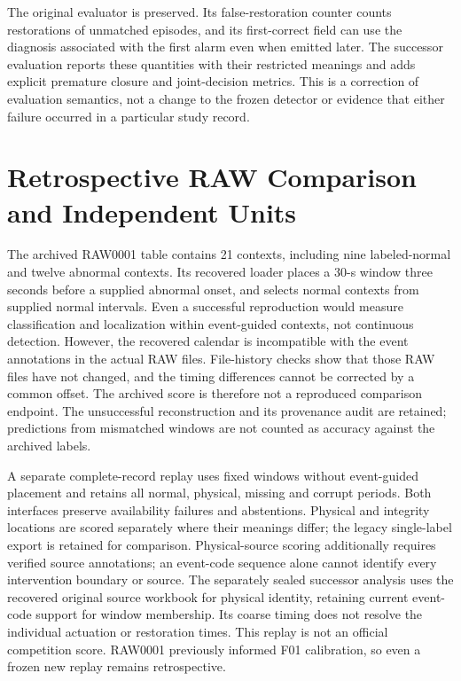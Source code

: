 The original evaluator is preserved. Its false-restoration
counter counts restorations of unmatched episodes, and its
first-correct field can use the diagnosis associated with the
first alarm even when emitted later. The successor evaluation reports these
quantities with their restricted meanings and adds explicit premature
closure and joint-decision metrics. This is a correction of evaluation
semantics, not a change to the frozen detector or evidence that either
failure occurred in a particular study record.

\section{Retrospective RAW Comparison and Independent Units}
\label{app:raw-contract}

The archived RAW0001 table contains 21 contexts, including nine labeled-normal
and twelve abnormal contexts. Its recovered loader places a 30-s window
three seconds before a supplied abnormal onset, and selects normal contexts
from supplied normal intervals. Even a successful reproduction would measure
classification and localization within event-guided contexts, not continuous
detection. However, the recovered calendar is incompatible with the event
annotations in the actual RAW files. File-history checks show that those
RAW files have not changed, and the timing differences cannot be corrected
by a common offset. The archived score is therefore not a reproduced
comparison endpoint. The unsuccessful reconstruction and its provenance
audit are retained; predictions from mismatched windows are not counted as
accuracy against the archived labels.\AIDraftingCredit{}

A separate complete-record replay uses fixed windows without event-guided
placement and retains all normal, physical, missing and corrupt periods.
Both interfaces preserve availability failures and abstentions. Physical
and integrity locations are scored separately where their meanings differ;
the legacy single-label export is retained for comparison. Physical-source
scoring additionally requires verified source annotations; an event-code
sequence alone cannot identify every intervention boundary or source.
The separately sealed successor analysis uses the recovered original
source workbook for physical identity, retaining current event-code
support for window membership. Its coarse timing does not resolve the
individual actuation or restoration times.
This replay is not an official competition score. RAW0001 previously informed F01
calibration, so even a frozen new replay remains retrospective.


